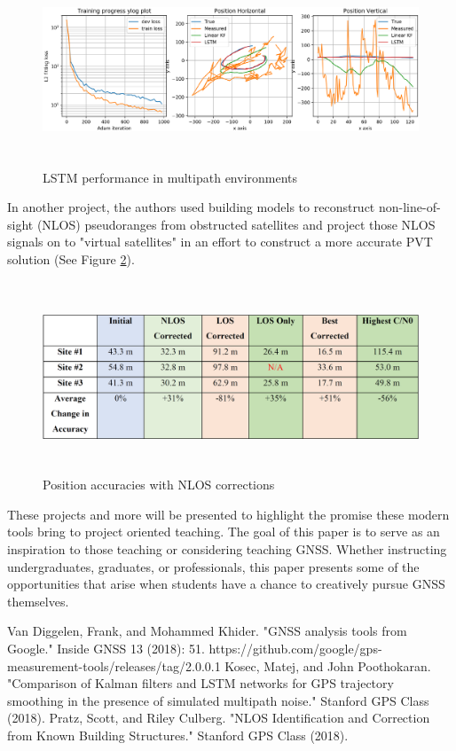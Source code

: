 \documentclass[12pt, conference, onecolumn, draftclsnofoot]{IEEEtran}
\begin{document}
\begin{figure}[H]
    \centering
    \includegraphics[width=6.5in, height=2.25in]{Figures/Mateh-LSTM.PNG}
    \caption{LSTM performance in multipath environments}
    \label{LSTM}
\end{figure}

In another project, the authors used building models to reconstruct non-line-of-sight (NLOS) pseudoranges from obstructed satellites and project those NLOS signals on to "virtual satellites" in an effort to construct a more accurate PVT solution \cite{NLOS2018} (See Figure \ref{NLOS}).

\begin{figure}[H]
    \centering
    \includegraphics[width=6.5in, height=2.25in]{Figures/NLOS-Table.PNG}
    \caption{Position accuracies with NLOS corrections}
    \label{NLOS}
\end{figure}

These projects and more will be presented to highlight the promise these modern tools bring to project oriented teaching.
The goal of this paper is to serve as an inspiration to those teaching or considering teaching GNSS.
Whether instructing undergraduates, graduates, or professionals, this paper presents some of the opportunities that arise when students have a chance to creatively pursue GNSS themselves.

\begin{thebibliography}{00}
     Van Diggelen, Frank, and Mohammed Khider. "GNSS analysis tools from Google." Inside GNSS 13 (2018): 51. 
     https://github.com/google/gps-measurement-tools/releases/tag/2.0.0.1
     Kosec, Matej, and John Poothokaran. "Comparison of Kalman filters and LSTM networks for GPS trajectory smoothing in the presence of simulated multipath noise." Stanford GPS Class (2018).
     Pratz, Scott, and Riley Culberg. "NLOS Identification and Correction from Known Building Structures." Stanford GPS Class (2018).
    
\end{thebibliography}
\end{document}
